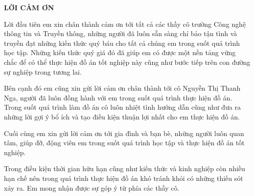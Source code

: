 \documentclass[../DoAn.tex]{subfiles}
\begin{document}
\begin{center}
    \Large{\textbf{LỜI CẢM ƠN}}\\
\end{center}
\vspace{1cm}

Lời đầu tiên em xin chân thành cảm ơn tới tất cả các thầy cô trường Công nghệ thông tin và Truyền thông, những người đã luôn sẵn sàng chỉ bảo tận tình và truyền đạt những kiến thức quý báu cho tất cả chúng em trong suốt quá trình học tập. Những kiến thức quý giá đó đã giúp em có được một nền tảng vững chắc để có thể thực hiện đồ án tốt nghiệp này cũng như bước tiếp trên con đường sự nghiệp trong tương lai.

Bên cạnh đó em cũng xin gửi lời cảm ơn chân thành tới cô Nguyễn Thị Thanh Nga, người đã luôn đồng hành với em trong suốt quá trình thực hiện đồ án. Trong suốt quá trình làm đồ án cô luôn nhiệt tình hướng dẫn cũng như đưa ra những lời gợi ý bổ ích và tạo điều kiện thuận lợi nhất cho em thực hiện đồ án.

Cuối cùng em xin gửi lời cảm ơn tới gia đình và bạn bè, những người luôn quan tâm, giúp đỡ, động viên em trong suốt quá trình học tập và thực hiện đồ án tốt nghiệp.

Trong điều kiện thời gian hữu hạn cũng như kiến thức và kinh nghiệp còn nhiều hạn chế nên trong quá trình thực hiện đồ án khó tránh khỏi có những thiếu sót xảy ra. Em mong nhận được sự góp ý từ phía các thầy cô.
\end{document}
